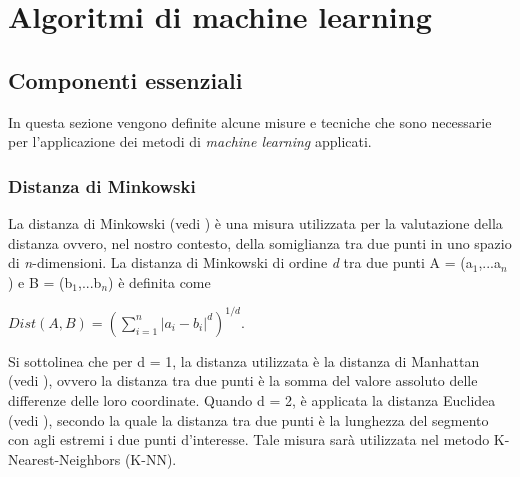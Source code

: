 
\chapter{Algoritmi di machine learning}
\label{cap:ML}
\section{Componenti essenziali}
In questa sezione vengono definite alcune misure e tecniche che sono necessarie per l'applicazione dei metodi di \emph{machine learning} applicati.
\subsection{Distanza di Minkowski}
La distanza di Minkowski (vedi \textit{\cite{minkdist}}) è una misura utilizzata per la valutazione della distanza ovvero, nel nostro contesto, della somiglianza tra due punti in uno spazio di \textit{n}-dimensioni. La distanza di Minkowski di ordine \emph{d} tra due punti A = (a$_1$,...a$_n$) e B = (b$_1$,...b$_n$) è definita come
\begin{center}
	$Dist(A,B) =  \left(\sum_{i = 1}^{n}|a_i-b_i|^d\right)^{1/d} $.
\end{center}

Si sottolinea che per d = 1, la distanza utilizzata è la distanza di Manhattan (vedi \textit{\cite{manhattan}}), ovvero la distanza tra due punti è la somma del valore assoluto delle differenze delle loro coordinate. Quando d = 2, è applicata la distanza Euclidea (vedi \textit{\cite{euclidea}}), secondo la quale la distanza tra due punti è la lunghezza del segmento con agli estremi i due punti d'interesse.
Tale misura sarà utilizzata nel metodo K-Nearest-Neighbors (K-NN).
